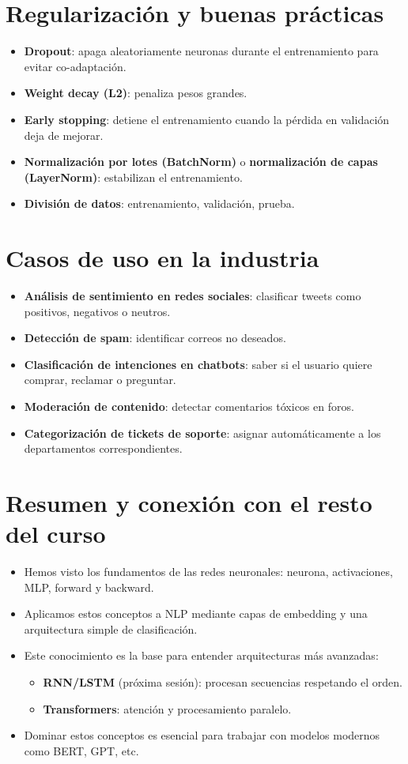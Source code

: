 \documentclass[12pt,a4paper,openany,oneside]{book}
\begin{document}
\section{Regularización y buenas prácticas}
\begin{itemize}
    \item \textbf{Dropout}: apaga aleatoriamente neuronas durante el entrenamiento para evitar co-adaptación.
    \item \textbf{Weight decay (L2)}: penaliza pesos grandes.
    \item \textbf{Early stopping}: detiene el entrenamiento cuando la pérdida en validación deja de mejorar.
    \item \textbf{Normalización por lotes (BatchNorm)} o \textbf{normalización de capas (LayerNorm)}: estabilizan el entrenamiento.
    \item \textbf{División de datos}: entrenamiento, validación, prueba.
\end{itemize}

\section{Casos de uso en la industria}
\begin{itemize}
    \item \textbf{Análisis de sentimiento en redes sociales}: clasificar tweets como positivos, negativos o neutros.
    \item \textbf{Detección de spam}: identificar correos no deseados.
    \item \textbf{Clasificación de intenciones en chatbots}: saber si el usuario quiere comprar, reclamar o preguntar.
    \item \textbf{Moderación de contenido}: detectar comentarios tóxicos en foros.
    \item \textbf{Categorización de tickets de soporte}: asignar automáticamente a los departamentos correspondientes.
\end{itemize}

\section{Resumen y conexión con el resto del curso}
\begin{itemize}
    \item Hemos visto los fundamentos de las redes neuronales: neurona, activaciones, MLP, forward y backward.
    \item Aplicamos estos conceptos a NLP mediante capas de embedding y una arquitectura simple de clasificación.
    \item Este conocimiento es la base para entender arquitecturas más avanzadas:
        \begin{itemize}
            \item \textbf{RNN/LSTM} (próxima sesión): procesan secuencias respetando el orden.
            \item \textbf{Transformers}: atención y procesamiento paralelo.
        \end{itemize}
    \item Dominar estos conceptos es esencial para trabajar con modelos modernos como BERT, GPT, etc.
\end{itemize}
\end{document}
